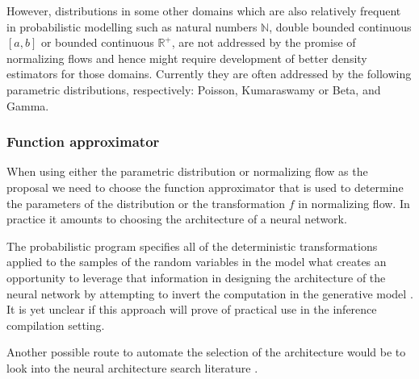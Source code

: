 \documentclass[12pt]{article}
\begin{document}

However, distributions in some other domains which are also relatively frequent in probabilistic modelling such as natural numbers $\mathbb{N}$, double bounded continuous $[a,b]$ or bounded continuous $\mathbb{R}^+$, are not addressed by the promise of normalizing flows and hence might require development of better density estimators for those domains.
Currently they are often addressed by the following parametric distributions, respectively: Poisson, Kumaraswamy or Beta, and Gamma.




\subsubsection*{Function approximator}
When using either the parametric distribution or normalizing flow as the proposal we need to choose the function approximator that is used to determine the parameters of the distribution or the transformation $f$ in normalizing flow.
In practice it amounts to choosing the architecture of a neural network.

The probabilistic program specifies all of the deterministic transformations applied to the samples of the random variables in the model
what creates an opportunity to leverage that information in designing the architecture of the neural network by attempting to invert the computation in the generative model \citep{TavaresEtAl2016,TavaresEtAl2017}.
It is yet unclear if this approach will prove of practical use in the inference compilation setting.

Another possible route to automate the selection of the architecture would be to look into the neural architecture search literature \citep{ElskenEtAl2018,ZophLe2017,pham18a}.







\end{document}
